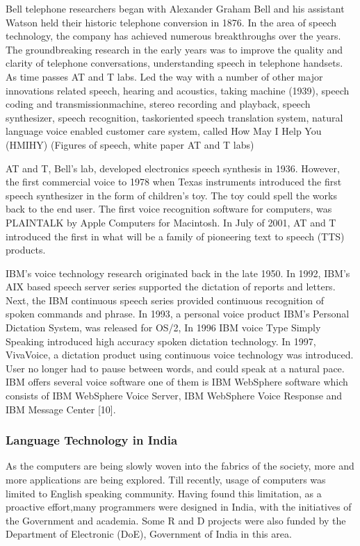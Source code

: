 \documentclass[12pt,a4paper,oneside]{memoir}
\begin{document}
Bell telephone researchers began with Alexander Graham Bell and his assistant
Watson held their historic telephone conversion in 1876. In the area of speech
technology, the company has achieved numerous breakthroughs over the years. The
groundbreaking research in the early years was to improve the quality and clarity of
telephone conversations, understanding speech in telephone handsets. As time passes
AT and T labs. Led the way with a number of other major innovations related speech,
hearing and acoustics, taking machine (1939), speech coding and transmissionmachine, stereo recording and playback, speech synthesizer, speech recognition, taskoriented speech translation system, natural language voice enabled customer care
system, called How May I Help You (HMIHY) (Figures of speech, white paper AT and
T labs)

AT and T, Bell’s lab, developed electronics speech synthesis in 1936. However, the
first commercial voice to 1978 when Texas instruments introduced the first speech
synthesizer in the form of children’s toy. The toy could spell the works back to the
end user. The first voice recognition software for computers, was PLAINTALK by
Apple Computers for Macintosh. In July of 2001, AT and T introduced the first in what
will be a family of pioneering text to speech (TTS) products.

IBM’s voice technology research originated back in the late 1950. In 1992, IBM’s
AIX based speech server series supported the dictation of reports and letters. Next, the
IBM continuous speech series provided continuous recognition of spoken commands
and phrase. In 1993, a personal voice product IBM’s Personal Dictation System, was
released for OS/2, In 1996 IBM voice Type Simply Speaking introduced high
accuracy spoken dictation technology. In 1997, VivaVoice, a dictation product using
continuous voice technology was introduced. User no longer had to pause between
words, and could speak at a natural pace. IBM offers several voice software one of
them is IBM WebSphere software which consists of IBM WebSphere Voice Server,
IBM WebSphere Voice Response and IBM Message Center [10].

\subsubsection{Language Technology in India}
As the computers are being slowly woven into the fabrics of the society, more and
more applications are being explored. Till recently, usage of computers was limited to
English speaking community. Having found this limitation, as a proactive effort,many programmers were designed in India, with the initiatives of the Government and
academia. Some R and D projects were also funded by the Department of Electronic
(DoE), Government of India in this area.
\end{document}

